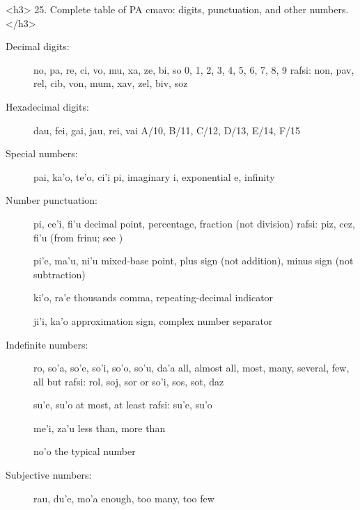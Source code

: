 <h3>
25. Complete table of PA cmavo: digits, punctuation, and
    other numbers.</h3>

Decimal digits:
\begin{description}
\item[] no, pa, re, ci, vo, mu, xa, ze, bi, so 0, 1, 2, 3, 4, 5, 6, 7, 8, 9 rafsi: non, pav, rel, cib, von, mum, xav, zel, biv, soz
\end{description}

Hexadecimal digits: 
\begin{description}
\item[] dau, fei, gai, jau, rei, vai A/10, B/11, C/12, D/13, E/14, F/15
\end{description}

Special numbers: 
\begin{description}
\item[] pai, ka'o, te'o, ci'i pi, imaginary i, exponential e, infinity
\end{description}

Number punctuation: 
\begin{description}
\item[] pi, ce'i, fi'u decimal point, percentage, fraction (not division) rafsi: piz, cez, fi'u (from frinu; see )
\item[] pi'e, ma'u, ni'u mixed-base point, plus sign (not addition), minus sign (not subtraction)
\item[] ki'o, ra'e thousands comma, repeating-decimal indicator
\item[] ji'i, ka'o approximation sign, complex number separator
\end{description}

Indefinite numbers: 
\begin{description}
\item[] ro, so'a, so'e, so'i, so'o, so'u, da'a all, almost all, most, many, several, few, all but rafsi: rol, soj, sor or so'i, sos, sot, daz
\item[] su'e, su'o at most, at least rafsi: su'e, su'o
\item[] me'i, za'u less than, more than
\item[] no'o the typical number

\end{description}

Subjective numbers:
\begin{description}
\item[] rau, du'e, mo'a enough, too many, too few

\end{description}

